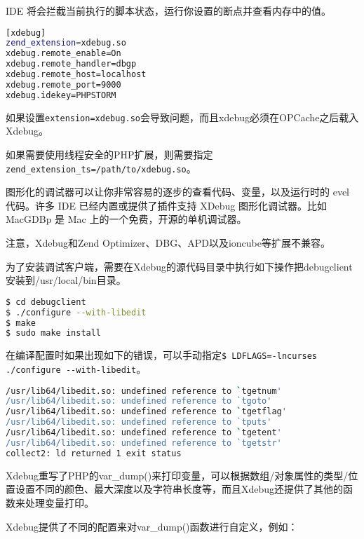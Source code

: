 IDE 将会拦截当前执行的脚本状态，运行你设置的断点并查看内存中的值。


\begin{lstlisting}[language=bash]
[xdebug]
zend_extension=xdebug.so
xdebug.remote_enable=On
xdebug.remote_handler=dbgp
xdebug.remote_host=localhost
xdebug.remote_port=9000
xdebug.idekey=PHPSTORM
\end{lstlisting}

\begin{compactitem}
\item 如果设置\texttt{extension=xdebug.so}会导致问题，而且xdebug必须在OPCache之后载入Xdebug。
\item 如果需要使用线程安全的PHP扩展，则需要指定\texttt{zend\_extension\_ts=/path/to/xdebug.so}。
\end{compactitem}



图形化的调试器可以让你非常容易的逐步的查看代码、变量，以及运行时的 evel 代码。许多 IDE 已经内置或提供了插件支持 XDebug 图形化调试器。比如 MacGDBp 是 Mac 上的一个免费，开源的单机调试器。

注意，Xdebug和Zend Optimizer、DBG、APD以及ioncube等扩展不兼容。

为了安装调试客户端，需要在Xdebug的源代码目录中执行如下操作把debugclient安装到/usr/local/bin目录。

\begin{lstlisting}[language=bash]
$ cd debugclient
$ ./configure --with-libedit
$ make
$ sudo make install
\end{lstlisting}

在编译配置时如果出现如下的错误，可以手动指定\texttt{\$ LDFLAGS=-lncurses ./configure -\/-with-libedit}。

\begin{lstlisting}[language=bash]
/usr/lib64/libedit.so: undefined reference to `tgetnum'
/usr/lib64/libedit.so: undefined reference to `tgoto'
/usr/lib64/libedit.so: undefined reference to `tgetflag'
/usr/lib64/libedit.so: undefined reference to `tputs'
/usr/lib64/libedit.so: undefined reference to `tgetent'
/usr/lib64/libedit.so: undefined reference to `tgetstr'
collect2: ld returned 1 exit status
\end{lstlisting}

Xdebug重写了PHP的var\_dump()来打印变量，可以根据数组/对象属性的类型/位置设置不同的颜色、最大深度以及字符串长度等，而且Xdebug还提供了其他的函数来处理变量打印。


Xdebug提供了不同的配置来对var\_dump()函数进行自定义，例如：

